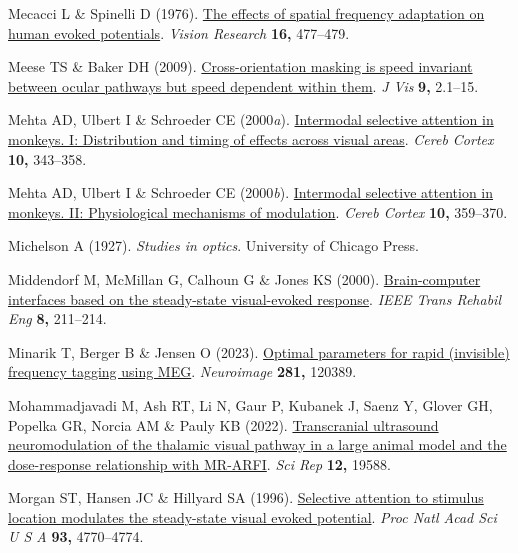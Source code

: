 \documentclass[
  letterpaper,
  DIV=11,
  numbers=noendperiod]{scrartcl}
\newlength{\cslhangindent}
\newenvironment{CSLReferences}[2] %
 {\begin{list}{}{%
  \setlength{\itemindent}{0pt}
  \setlength{\leftmargin}{0pt}
  \setlength{\parsep}{0pt}
  \ifodd #1
   \setlength{\leftmargin}{\cslhangindent}
   \setlength{\itemindent}{-1\cslhangindent}
  \fi
  \setlength{\itemsep}{#2\baselineskip}}}
 {\end{list}}
\begin{document}
\begin{CSLReferences}{1}{1}
Mecacci L \& Spinelli D (1976).
\href{https://doi.org/10.1016/0042-6989(76)90025-0}{The effects of
spatial frequency adaptation on human evoked potentials}. \emph{Vision
Research} \textbf{16,} 477--479.

Meese TS \& Baker DH (2009).
\href{https://doi.org/10.1167/9.5.2}{Cross-orientation masking is speed
invariant between ocular pathways but speed dependent within them}.
\emph{J Vis} \textbf{9,} 2.1--15.

Mehta AD, Ulbert I \& Schroeder CE (2000\emph{a}).
\href{https://doi.org/10.1093/cercor/10.4.343}{Intermodal selective
attention in monkeys. I: Distribution and timing of effects across
visual areas}. \emph{Cereb Cortex} \textbf{10,} 343--358.

Mehta AD, Ulbert I \& Schroeder CE (2000\emph{b}).
\href{https://doi.org/10.1093/cercor/10.4.359}{Intermodal selective
attention in monkeys. II: Physiological mechanisms of modulation}.
\emph{Cereb Cortex} \textbf{10,} 359--370.

Michelson A (1927). \emph{Studies in optics}. University of Chicago
Press.

Middendorf M, McMillan G, Calhoun G \& Jones KS (2000).
\href{https://doi.org/10.1109/86.847819}{Brain-computer interfaces based
on the steady-state visual-evoked response}. \emph{IEEE Trans Rehabil
Eng} \textbf{8,} 211--214.

Minarik T, Berger B \& Jensen O (2023).
\href{https://doi.org/10.1016/j.neuroimage.2023.120389}{Optimal
parameters for rapid (invisible) frequency tagging using MEG}.
\emph{Neuroimage} \textbf{281,} 120389.

Mohammadjavadi M, Ash RT, Li N, Gaur P, Kubanek J, Saenz Y, Glover GH,
Popelka GR, Norcia AM \& Pauly KB (2022).
\href{https://doi.org/10.1038/s41598-022-20554-4}{Transcranial
ultrasound neuromodulation of the thalamic visual pathway in a large
animal model and the dose-response relationship with MR-ARFI}. \emph{Sci
Rep} \textbf{12,} 19588.

Morgan ST, Hansen JC \& Hillyard SA (1996).
\href{https://doi.org/10.1073/pnas.93.10.4770}{Selective attention to
stimulus location modulates the steady-state visual evoked potential}.
\emph{Proc Natl Acad Sci U S A} \textbf{93,} 4770--4774.


\end{CSLReferences}
\end{document}
